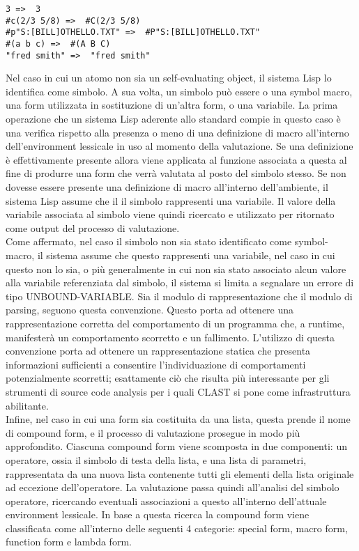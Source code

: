 \begin{lstlisting}
3 =>  3
#c(2/3 5/8) =>  #C(2/3 5/8)
#p"S:[BILL]OTHELLO.TXT" =>  #P"S:[BILL]OTHELLO.TXT"
#(a b c) =>  #(A B C)
"fred smith" =>  "fred smith"
\end{lstlisting}

Nel caso in cui un atomo non sia un self-evaluating object, il sistema Lisp lo
identifica come simbolo. A sua volta, un simbolo può essere o una symbol
macro, una form utilizzata in sostituzione di un’altra form, o una variabile.
La prima operazione che un sistema Lisp aderente allo standard compie in
questo caso è una verifica rispetto alla presenza o meno di una definizione di
macro all’interno dell’environment lessicale in uso al momento della
valutazione. Se una definizione è effettivamente presente allora viene
applicata al funzione associata a questa al fine di produrre una form che
verrà valutata al posto del simbolo stesso. Se non dovesse essere presente una
definizione di macro all’interno dell’ambiente, il sistema Lisp assume che il
il simbolo rappresenti una variabile. Il valore della variabile associata al
simbolo viene quindi ricercato e utilizzato per ritornato come output del
processo di valutazione.\\

Come affermato, nel caso il simbolo non sia stato identificato come symbol-
macro, il sistema assume che questo rappresenti una variabile, nel caso in cui
questo non lo sia, o più generalmente in cui non sia stato associato alcun
valore alla variabile referenziata dal simbolo, il sistema si limita a
segnalare un errore di tipo UNBOUND-VARIABLE. Sia il modulo di
rappresentazione che il modulo di parsing, seguono questa convenzione. Questo
porta ad ottenere una rappresentazione corretta del comportamento di un
programma che, a runtime, manifesterà un comportamento scorretto e un
fallimento. L’utilizzo di questa convenzione porta ad ottenere un
rappresentazione statica che presenta informazioni sufficienti a consentire
l’individuazione di comportamenti potenzialmente scorretti; esattamente ciò
che risulta più interessante per gli strumenti di source code analysis per i
quali CLAST si pone come infrastruttura abilitante.\\

Infine, nel caso in cui una form sia costituita da una lista, questa prende il
nome di compound form, e il processo di valutazione prosegue in modo più
approfondito. Ciascuna compound form viene scomposta in due componenti: un
operatore, ossia il simbolo di testa della lista, e una lista di parametri,
rappresentata da una nuova lista contenente tutti gli elementi della lista
originale ad eccezione dell’operatore. La valutazione passa quindi all’analisi
del simbolo operatore, ricercando eventuali associazioni a questo all’interno
dell’attuale environment lessicale. In base a questa ricerca la compound form
viene classificata come all’interno delle seguenti 4 categorie: special form,
macro form, function form e lambda form.

